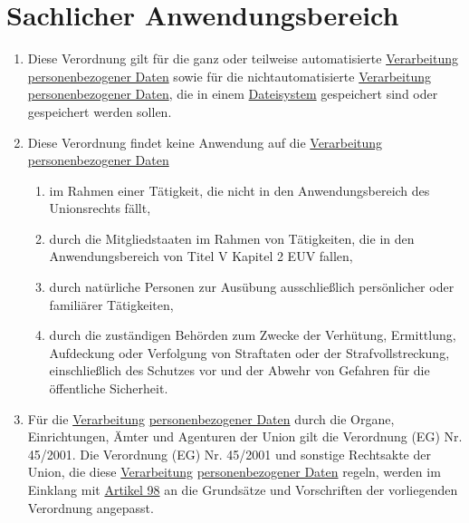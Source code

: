 \chapter{Sachlicher Anwendungsbereich}
\label{ch:2}

\begin{enumerate}

  \item Diese Verordnung gilt für die ganz oder teilweise automatisierte \hyperref[itm:04-2]{Verarbeitung} \hyperref
   [itm:04-1]{personenbezogener Daten} sowie für die nichtautomatisierte \hyperref[itm:04-2]{Verarbeitung} \hyperref
   [itm:04-1]{personenbezogener Daten}, die in einem \hyperref[itm:04-6]{Dateisystem} gespeichert sind oder gespeichert
   werden sollen.%
  \label{itm:02-1}

  \item Diese Verordnung findet keine Anwendung auf die \hyperref[itm:04-2]{Verarbeitung} \hyperref[itm:04-1]
   {personenbezogener Daten}%
  \label{itm:02-2}

  \begin{enumerate}
  
    \item im Rahmen einer Tätigkeit, die nicht in den Anwendungsbereich des Unionsrechts fällt,%
    \label{itm:02-2a}

    \item durch die Mitgliedstaaten im Rahmen von Tätigkeiten, die in den Anwendungsbereich von Titel V Kapitel 2
     EUV fallen,
    \label{itm:02-2b}

    \item durch natürliche Personen zur Ausübung ausschließlich persönlicher oder familiärer Tätigkeiten,%
    \label{itm:02-2c}

    \item durch die zuständigen Behörden zum Zwecke der Verhütung, Ermittlung, Aufdeckung oder Verfolgung von Straftaten
     oder der Strafvollstreckung, einschließlich des Schutzes vor und der Abwehr von Gefahren für die öffentliche
     Sicherheit.%
    \label{itm:02-2d}

  \end{enumerate}

  \item Für die \hyperref[itm:04-2]{Verarbeitung} \hyperref[itm:04-1]{personenbezogener Daten} durch die Organe,
   Einrichtungen, Ämter und Agenturen der Union gilt die Verordnung (EG) Nr. 45/2001. Die Verordnung (EG) Nr. 45/2001
   und sonstige Rechtsakte der Union, die diese \hyperref[itm:04-2]{Verarbeitung} \hyperref[itm:04-1]
   {personenbezogener Daten} regeln, werden im Einklang mit \hyperref[ch:98]{Artikel 98} an die Grundsätze und
   Vorschriften der vorliegenden Verordnung angepasst.%
  \label{itm:02-3}


\end{enumerate}
